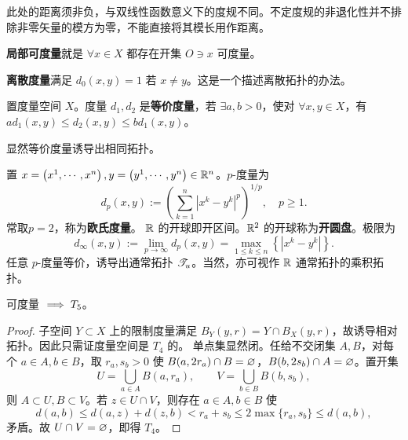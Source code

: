 \begin{remark}
    此处的距离须非负，与双线性函数意义下的度规不同。不定度规的非退化性并不排除非零矢量的模方为零，不能直接将其模长用作距离。
\end{remark}

\begin{definition}
    \textbf{局部可度量}就是 $\forall x\in X$ 都存在开集 $O\ni x$ 可度量。
\end{definition}

\begin{example}
    \textbf{离散度量}满足 $d_{0}(x,y)=1$ 若 $x \ne y$。这是一个描述离散拓扑的办法。
\end{example}

\begin{definition}
    置度量空间 $X$。度量 $d_{1},d_{2}$ 是\textbf{等价度量}，若 $\exists a,b>0$，使对 $\forall x,y \in X$，有 $a d_{1}(x, y) \leqslant d_{2}(x, y) \leqslant b d_{1}(x, y)$。
\end{definition}

\begin{remark}
    显然等价度量诱导出相同拓扑。
\end{remark}

\begin{example}
    置 $x=\left(x^1,\cdots,x^{n}\right),y=\left(y^{1},\cdots,y^{n}\right)\in\mathbb{R}^{n}$。$p$-度量为
\[
d_{p}(x, y):=\left(\sum_{k=1}^{n}\left|x^{k}-y^{k}\right|^{p}\right)^{1 / p},\quad p \geqslant 1.
\]
常取$p=2$，称为\textbf{欧氏度量}。
$\mathbb{R}$ 的开球即开区间。$\mathbb{R}^2$ 的开球称为\textbf{开圆盘}。极限为
\[
d_{\infty}(x,y):=\lim_{p\to\infty}d_{p}(x, y)=\max _{1 \leqslant k \leqslant n}\left\{\left|x^{k}-y^{k}\right|\right\}.
\]
任意 $p$-度量等价，诱导出通常拓扑 $\mathscr T_u$。当然，亦可视作 $\mathbb{R}$ 通常拓扑的乘积拓扑。
\end{example}

\begin{theorem}
    可度量 $\implies T_5$。
\end{theorem}

\begin{proof}
    子空间 $Y\subset X$ 上的限制度量满足 $B_Y(y,r)=Y\cap B_X(y,r)$，故诱导相对拓扑。因此只需证度量空间是 $T_4$ 的。
    单点集显然闭。任给不交闭集 $A,B$，对每个 $a\in A,b\in B$，取 $r_a,s_b>0$ 使 $B(a,2r_a)\cap B=\varnothing$，$B(b,2s_b)\cap A=\varnothing$。置开集
    \[
        U=\bigcup_{a\in A}B(a,r_a),\qquad V=\bigcup_{b\in B}B(b,s_b),
    \]
    则 $A\subset U,B\subset V$。若 $z\in U\cap V$，则存在 $a\in A,b\in B$ 使
    \[
        d(a,b)\leqslant d(a,z)+d(z,b)<r_a+s_b\leqslant 2\max\{r_a,s_b\}\leqslant d(a,b),
    \]
    矛盾。故 $U\cap V=\varnothing$，即得 $T_4$。
\end{proof}

